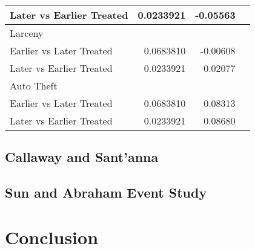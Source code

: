 \documentclass{article}
\begin{document}
\begin{table}[h]
\begin{tabular}[t]{lrrl}
\hspace{3mm}Later vs Earlier Treated & 0.0233921 & -0.05563\\
\midrule
Larceny\\
\hspace{3mm}Earlier vs Later Treated & 0.0683810 & -0.00608\\
\hspace{3mm}Later vs Earlier Treated & 0.0233921 & 0.02077\\
\midrule
Auto Theft\\
\hspace{3mm}Earlier vs Later Treated & 0.0683810 & 0.08313\\
\hspace{3mm}Later vs Earlier Treated & 0.0233921 & 0.08680\\
\bottomrule
\end{tabular}
\end{table}
\subsection*{Callaway and Sant'anna}
\subsection*{Sun and Abraham Event Study}
\section*{Conclusion} 
\end{document}
